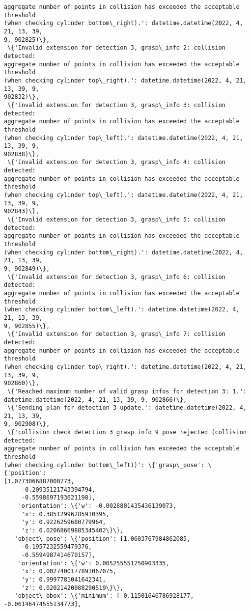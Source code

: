 \documentclass[11pt]{article}
\begin{document}
\begin{tcolorbox}[breakable, size=fbox, boxrule=.5pt, pad at break*=1mm, opacityfill=0]
\begin{Verbatim}[commandchars=\\\{\}]
aggregate number of points in collision has exceeded the acceptable threshold
(when checking cylinder bottom\_right).': datetime.datetime(2022, 4, 21, 13, 39,
9, 902825)\},
 \{'Invalid extension for detection 3, grasp\_info 2: collision detected:
aggregate number of points in collision has exceeded the acceptable threshold
(when checking cylinder top\_right).': datetime.datetime(2022, 4, 21, 13, 39, 9,
902832)\},
 \{'Invalid extension for detection 3, grasp\_info 3: collision detected:
aggregate number of points in collision has exceeded the acceptable threshold
(when checking cylinder top\_left).': datetime.datetime(2022, 4, 21, 13, 39, 9,
902838)\},
 \{'Invalid extension for detection 3, grasp\_info 4: collision detected:
aggregate number of points in collision has exceeded the acceptable threshold
(when checking cylinder top\_left).': datetime.datetime(2022, 4, 21, 13, 39, 9,
902843)\},
 \{'Invalid extension for detection 3, grasp\_info 5: collision detected:
aggregate number of points in collision has exceeded the acceptable threshold
(when checking cylinder bottom\_right).': datetime.datetime(2022, 4, 21, 13, 39,
9, 902849)\},
 \{'Invalid extension for detection 3, grasp\_info 6: collision detected:
aggregate number of points in collision has exceeded the acceptable threshold
(when checking cylinder bottom\_left).': datetime.datetime(2022, 4, 21, 13, 39,
9, 902855)\},
 \{'Invalid extension for detection 3, grasp\_info 7: collision detected:
aggregate number of points in collision has exceeded the acceptable threshold
(when checking cylinder top\_right).': datetime.datetime(2022, 4, 21, 13, 39, 9,
902860)\},
 \{'Reached maximum number of valid grasp infos for detection 3: 1.':
datetime.datetime(2022, 4, 21, 13, 39, 9, 902866)\},
 \{'Sending plan for detection 3 update.': datetime.datetime(2022, 4, 21, 13, 39,
9, 902908)\},
 \{'collision check detection 3 grasp info 9 pose rejected (collision detected:
aggregate number of points in collision has exceeded the acceptable threshold
(when checking cylinder bottom\_left))': \{'grasp\_pose': \{'position':
[1.0773066887000773,
     -0.20935121743394794,
     -0.5598697193621198],
    'orientation': \{'w': -0.0028801435436139073,
     'x': 0.38512996285910395,
     'y': 0.9226259680779964,
     'z': 0.02068669885345402\}\},
   'object\_pose': \{'position': [1.0603767984862085,
     -0.1957232559479376,
     -0.5594987414670157],
    'orientation': \{'w': 0.005255551250903335,
     'x': 0.0027400177891067075,
     'y': 0.9997781041642341,
     'z': 0.02021420088290519\}\},
   'object\_bbox': \{'minimum': [-0.11501646786928177, -0.06146474555134773],

\end{Verbatim}
\end{tcolorbox}
\end{document}
